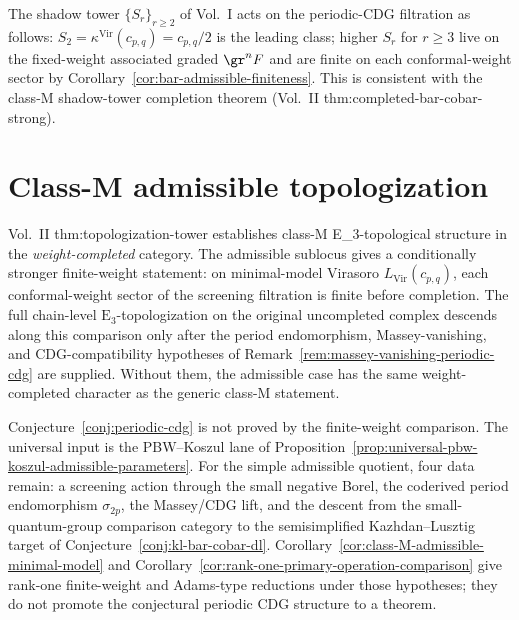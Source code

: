 \begin{remark}
\label{rem:shadow-tower-admissible-minimal}
The shadow tower $\{S_r\}_{r \geq 2}$ of Vol.~I acts on the
periodic-CDG filtration as follows: $S_2 = \kappa^{\mathrm{Vir}}(c_{p,q})
= c_{p,q}/2$ is the leading class; higher $S_r$ for $r \geq 3$
live on the fixed-weight associated graded $\gr^n F$ and are finite
on each conformal-weight sector by
Corollary~\ref{cor:bar-admissible-finiteness}.  This is consistent with
the class-M shadow-tower completion theorem
\textup{(}Vol.~II thm:completed-bar-cobar-strong\textup{)}.
\end{remark}

\section{Class-M admissible topologization}
\label{sec:bridge-to-vol-ii}

\begin{remark}
\label{rem:bridge-vol-ii-class-m}
Vol.~II thm:topologization-tower establishes class-M
E_3-topological structure in the \emph{weight-completed}
category. The admissible sublocus gives a conditionally stronger
finite-weight statement: on minimal-model Virasoro
$L_{\mathrm{Vir}}(c_{p,q})$, each conformal-weight sector of the
screening filtration is finite before completion.  The full
chain-level $\mathrm{E}_3$-topologization on the original uncompleted
complex descends along this comparison only after the period endomorphism,
Massey-vanishing, and CDG-compatibility hypotheses of
Remark~\ref{rem:massey-vanishing-periodic-cdg} are supplied.  Without
them, the admissible case has the same weight-completed character as
the generic class-M statement.
\end{remark}

\begin{remark}
\label{rem:master-conjecture-update-periodic-cdg}
Conjecture~\ref{conj:periodic-cdg} is not proved by the finite-weight
comparison.  The universal input is the PBW--Koszul lane of
Proposition~\ref{prop:universal-pbw-koszul-admissible-parameters}.
For the simple admissible quotient, four data remain: a screening
action through the small negative Borel, the coderived period
endomorphism $\sigma_{2p}$, the Massey/CDG lift, and the
descent from the small-quantum-group comparison category to the
semisimplified Kazhdan--Lusztig target of
Conjecture~\ref{conj:kl-bar-cobar-dl}.  Corollary~\ref{cor:class-M-admissible-minimal-model}
and Corollary~\ref{cor:rank-one-primary-operation-comparison} give rank-one
finite-weight and Adams-type reductions under those hypotheses; they
do not promote the conjectural periodic CDG structure to a theorem.
\end{remark}

